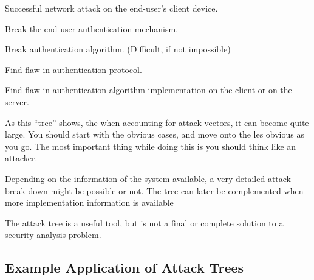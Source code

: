 \begin{nestednums}
\begin{nestednums}
\begin{nestednums}
    \item Successful network attack on the end-user's client device.
    \end{nestednums}
  \item Break the end-user authentication mechanism.
    \begin{nestednums}
    \item Break authentication algorithm. (Difficult, if not impossible)
    \item Find flaw in authentication protocol.
    \item Find flaw in authentication algorithm implementation on the client or on the server.
    \end{nestednums}
  \end{nestednums}
\end{nestednums}

As this ``tree'' shows, the when accounting for attack vectors, it can become quite large.
You should start with the obvious cases, and move onto the les obvious as you go.
The most important thing while doing this is you should think like an attacker.

\begin{remark*}
  Depending on the information of the system available, a very detailed attack break-down might be possible or not. The tree can later be complemented when more implementation information is available
\end{remark*}

\begin{remark*}
  The attack tree is a useful tool, but is not a final or complete solution to a security analysis problem.
\end{remark*}

\subsection{Example Application of Attack Trees}\label{subsec:Attack_Tree_Example}

